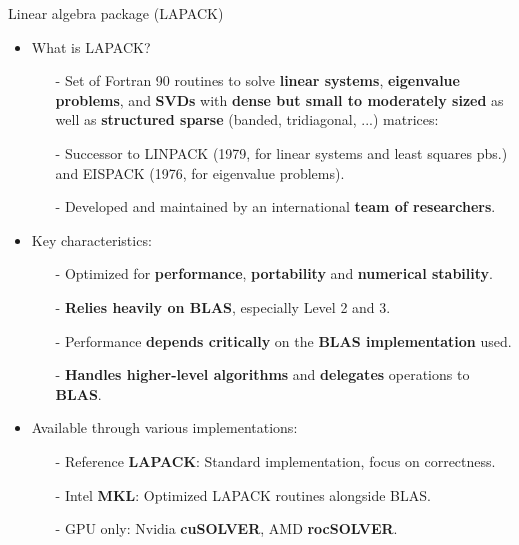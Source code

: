 \documentclass[t,usepdftitle=false]{beamer}
\begin{document}
\begin{frame}{Linear algebra package (LAPACK)}
\begin{itemize}
\item What is LAPACK?
\begin{itemize}\normalsize
\item[-] Set of Fortran 90 routines to solve \textbf{linear systems}, \textbf{eigenvalue problems}, and \textbf{SVDs} with \textbf{dense but small to moderately sized} as well as \textbf{structured sparse} (banded, tridiagonal, ...) matrices:\vspace{.05cm}
\item[-] Successor to LINPACK (1979, for linear systems and least squares pbs.)\\
\hspace{1.4cm}and EISPACK (1976, for eigenvalue problems).\vspace{.05cm}
\item[-] Developed and maintained by an international \textbf{team of researchers}.%
\end{itemize}
\item Key characteristics:
\begin{itemize}\normalsize
\item[-] Optimized for \textbf{performance}, \textbf{portability} and \textbf{numerical stability}.\vspace{.05cm}
\item[-] \textbf{Relies heavily on BLAS}, especially Level 2 and 3.\vspace{.05cm}
\item[-] Performance \textbf{depends critically} on the \textbf{BLAS implementation} used.\vspace{.05cm}
\item[-] \textbf{Handles higher-level algorithms} and \textbf{delegates} operations to \textbf{BLAS}.\vspace{.05cm}
\end{itemize}
\item Available through various implementations:
\begin{itemize}\normalsize
\item[-] Reference \textbf{LAPACK}: Standard implementation, focus on correctness.\vspace{.05cm}
\item[-] Intel \textbf{MKL}: Optimized LAPACK routines alongside BLAS.\vspace{.05cm}
\item[-] GPU only: Nvidia \textbf{cuSOLVER}, AMD \textbf{rocSOLVER}.
\end{itemize}
\end{itemize}
\end{frame}
\end{document}
